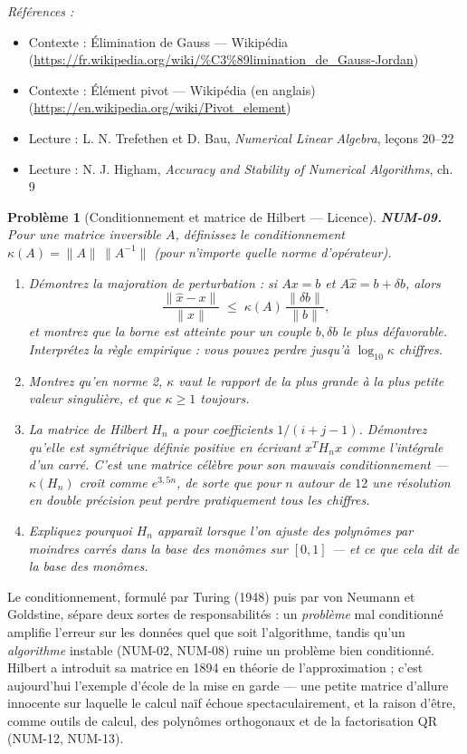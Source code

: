 \documentclass[11pt]{article}
\newtheorem{problem}{Problème}
\newenvironment{refs}{\par\small\noindent\emph{Références :}\begin{itemize}\setlength\itemsep{0pt}}{\end{itemize}\normalsize}
\begin{document}
\begin{refs}
\item Contexte : Élimination de Gauss --- Wikipédia (\url{https://fr.wikipedia.org/wiki/%C3%89limination_de_Gauss-Jordan})
\item Contexte : Élément pivot --- Wikipédia (en anglais) (\url{https://en.wikipedia.org/wiki/Pivot_element})
\item Lecture : L. N. Trefethen et D. Bau, \textit{Numerical Linear Algebra}, leçons 20--22
\item Lecture : N. J. Higham, \textit{Accuracy and Stability of Numerical Algorithms}, ch. 9
\end{refs}

\bigskip

\begin{problem}[{Conditionnement et matrice de Hilbert --- Licence}]
\textbf{NUM-09.} Pour une matrice inversible $A$, définissez le
conditionnement $\kappa(A) = \|A\|\,\|A^{-1}\|$ (pour n'importe quelle norme
d'opérateur).
\begin{enumerate}
\item[(a)] Démontrez
la majoration de perturbation : si $Ax = b$ et $A\hat{x} = b + \delta b$, alors
\[ \frac{\|\hat{x} - x\|}{\|x\|} \;\le\; \kappa(A)\,\frac{\|\delta b\|}{\|b\|}, \]
et montrez que la borne est atteinte pour un couple $b, \delta b$ le plus défavorable.
Interprétez la règle empirique : vous pouvez perdre jusqu'à $\log_{10}\kappa$
chiffres.
\item[(b)] Montrez qu'en
norme 2, $\kappa$ vaut le rapport de la plus grande à la plus petite valeur
singulière, et que $\kappa \ge 1$ toujours.
\item[(c)] La matrice de Hilbert $H_n$ a pour coefficients
$1/(i + j - 1)$. Démontrez qu'elle est symétrique définie positive en écrivant
$x^T H_n x$ comme l'intégrale d'un carré. C'est une matrice célèbre pour son mauvais
conditionnement --- $\kappa(H_n)$ croît comme $e^{3{,}5 n}$, de sorte que pour $n$
autour de $12$ une résolution en double précision peut perdre pratiquement tous les
chiffres.
\item[(d)] Expliquez pourquoi $H_n$ apparaît lorsque l'on ajuste des
polynômes par moindres carrés dans la base des monômes sur $[0,1]$ --- et ce que cela
dit de la base des monômes.
\end{enumerate}

\end{problem}

\noindent Le conditionnement, formulé par Turing (1948) puis par von
Neumann et Goldstine, sépare deux sortes de responsabilités : un \textit{problème} mal
conditionné amplifie l'erreur sur les données quel que soit l'algorithme, tandis qu'un
\textit{algorithme} instable (NUM-02, NUM-08) ruine un problème bien conditionné.
Hilbert a introduit sa matrice en 1894 en théorie de l'approximation ; c'est
aujourd'hui l'exemple d'école de la mise en garde --- une petite matrice d'allure
innocente sur laquelle le calcul naïf échoue spectaculairement, et la raison d'être,
comme outils de calcul, des polynômes orthogonaux et de la factorisation QR (NUM-12,
NUM-13).
\end{document}
